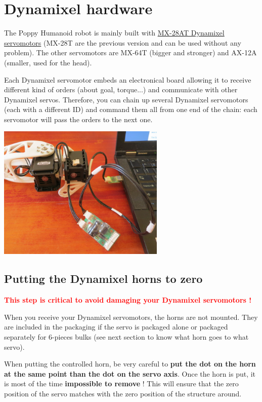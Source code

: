 \documentclass{article}
\begin{document}
\section{Dynamixel hardware}

The Poppy Humanoid robot is mainly built with \href{http://www.generationrobots.com/en/401858-servomotor-dynamixel-mx-28at.html}{MX-28AT Dynamixel servomotors} (MX-28T are the previous version and can be used without any problem). The other servomotors are MX-64T (bigger and stronger) and AX-12A (smaller, used for the head).

Each Dynamixel servomotor embeds an electronical board allowing it to receive different kind of orders (about goal, torque...) and communicate with other Dynamixel servos. Therefore, you can chain up several Dynamixel servomotors (each with a different ID) and command them all from one end of the chain: each servomotor will pass the orders to the next one. 

 \begin{center}
  \includegraphics[width=0.6\textwidth]{daisy_link}
 \end{center}
 

\subsection{Putting the Dynamixel horns to zero}
\label{dynamixel-zero}

\textcolor{red}{\textbf{This step is critical to avoid damaging your Dynamixel servomotors !}}

When you receive your Dynamixel servomotors, the horns are not mounted. They are included in the packaging if the servo is packaged alone or packaged separately for 6-pieces bulks (see next section to know what horn goes to what servo).

When putting the controlled horn, be very careful to \textbf{put the dot on the horn at the same point than the dot on the servo axis}. Once the horn is put, it is most of the time \textbf{impossible to remove} ! This will ensure that the zero position of the servo matches with the zero position of the structure around.
\end{document}
